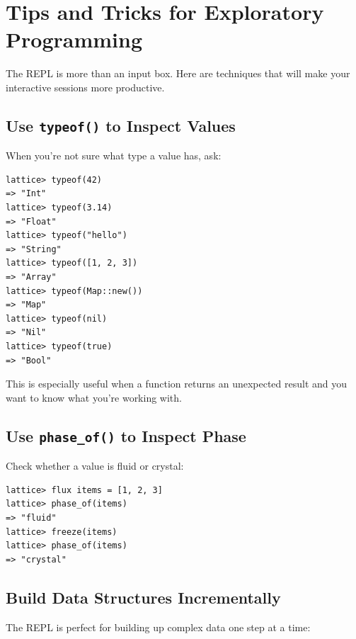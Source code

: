 \section{Tips and Tricks for Exploratory Programming}\label{sec:repl-tips}

The REPL is more than an input box.
Here are techniques that will make your interactive sessions more productive.

\subsection{Use \texttt{typeof()} to Inspect Values}\label{subsec:typeof-repl}

When you're not sure what type a value has, ask:

\begin{lstlisting}[language=Lattice, numbers=none]
lattice> typeof(42)
=> "Int"
lattice> typeof(3.14)
=> "Float"
lattice> typeof("hello")
=> "String"
lattice> typeof([1, 2, 3])
=> "Array"
lattice> typeof(Map::new())
=> "Map"
lattice> typeof(nil)
=> "Nil"
lattice> typeof(true)
=> "Bool"
\end{lstlisting}

This is especially useful when a function returns an unexpected result and you want to know what you're working with.

\subsection{Use \texttt{phase\_of()} to Inspect Phase}\label{subsec:phaseof-repl}

Check whether a value is fluid or crystal:

\begin{lstlisting}[language=Lattice, numbers=none]
lattice> flux items = [1, 2, 3]
lattice> phase_of(items)
=> "fluid"
lattice> freeze(items)
lattice> phase_of(items)
=> "crystal"
\end{lstlisting}

\subsection{Build Data Structures Incrementally}\label{subsec:incremental-building}

The REPL is perfect for building up complex data one step at a time:

